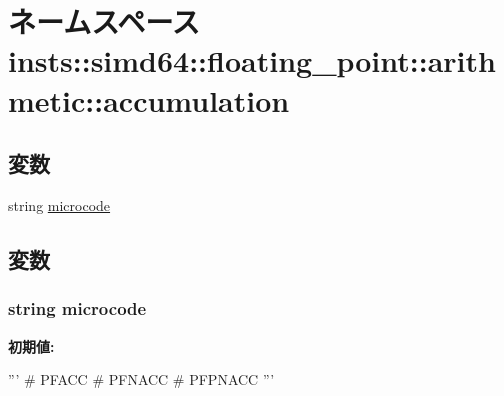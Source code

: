 \hypertarget{namespaceinsts_1_1simd64_1_1floating__point_1_1arithmetic_1_1accumulation}{
\section{ネームスペース insts::simd64::floating\_\-point::arithmetic::accumulation}
\label{namespaceinsts_1_1simd64_1_1floating__point_1_1arithmetic_1_1accumulation}
}
\subsection*{変数}
\begin{DoxyCompactItemize}
\item 
string \hyperlink{namespaceinsts_1_1simd64_1_1floating__point_1_1arithmetic_1_1accumulation_a770f11a173e99389a8802f0107ed8f52}{microcode}
\end{DoxyCompactItemize}


\subsection{変数}
\hypertarget{namespaceinsts_1_1simd64_1_1floating__point_1_1arithmetic_1_1accumulation_a770f11a173e99389a8802f0107ed8f52}{
\subsubsection[{microcode}]{\setlength{\rightskip}{0pt plus 5cm}string {\bf microcode}}}
\label{namespaceinsts_1_1simd64_1_1floating__point_1_1arithmetic_1_1accumulation_a770f11a173e99389a8802f0107ed8f52}
{\bfseries 初期値:}
\begin{DoxyCode}
'''
# PFACC
# PFNACC
# PFPNACC
'''
\end{DoxyCode}
